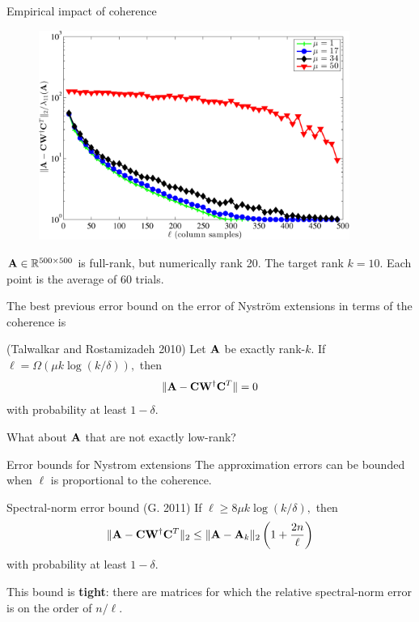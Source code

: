 \documentclass[xcolor=x11names,compress,ignorenonframetext]{beamer}
\renewcommand{\(}{\begin{columns}}
\renewcommand{\)}{\end{columns}}
\newcommand{\<}[1]{\begin{column}{#1}}
\renewcommand{\>}{\end{column}}
\def\refcolor{DodgerBlue4}
\newcommand{\refer}[1]{({\color{\refcolor}#1})}
\begin{document}
  \begin{frame}{Empirical impact of coherence}

 \begin{figure}[h]
 \centering
\centerline{\includegraphics[width=4in,keepaspectratio=true]{nystromcoherencedependence}} 
 \end{figure}
 \vspace{-2em}
$\mathbf{A} \in \mathbb{R}^{500 \times 500}$ is full-rank, but numerically rank 20. The target rank $k = 10.$
Each point is the average of 60 trials.


\end{frame}

 \begin{frame}
 The best previous error bound on the error of Nystr\"om extensions in terms of the coherence is 
 
 \begin{block}{\refer{Talwalkar and Rostamizadeh 2010}}
  Let $\mathbf{A}$ be exactly rank-$k$. If $\ell = \Omega(\mu k \log(k/\delta)),$ then 
  \[ \|\mathbf{A} - \mathbf{C} \mathbf{W}^\dagger \mathbf{C}^T\| = 0 \]
  with probability at least $1-\delta.$
 \end{block}

 What about $\mathbf{A}$ that are not exactly low-rank?
 \end{frame}
 
 \begin{frame}{Error bounds for Nystrom extensions}
  The approximation errors can be bounded when $\ell$ is proportional to the coherence.
  
  \begin{block}{Spectral-norm error bound \refer{G. 2011}}
   If $\ell \geq 8 \mu k \log(k/\delta),$ then
   \[ \|\mathbf{A} - \mathbf{C} \mathbf{W}^\dagger \mathbf{C}^T\|_2 \leq \|\mathbf{A} - \mathbf{A}_k\|_2 \left(1 + \frac{2 n}{\ell} \right)\]
   with probability at least $1 - \delta.$ 
  \end{block}

  This bound is \textbf{tight}: there are matrices for which the relative
  spectral-norm error is on the order of $n/\ell.$
 \end{frame} 
\end{document}
